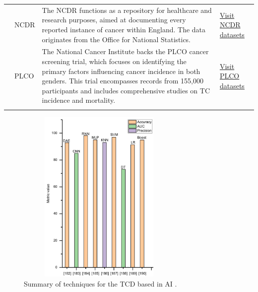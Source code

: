 \documentclass[a4paper,fleqn]{cas-sc}
\begin{document}
\begin{table}[tbph]
\begin{center}
\begin{tabular}{m{0.5cm}m{1cm}m{10cm}m{4cm}}
{ \cite{d6}} & { NCDR} &  The \ac{NCDR} functions as a repository for healthcare and research purposes, aimed at documenting every reported instance of cancer within England. The data originates from the Office for National Statistics. & \href{http://www.ncin.org.uk/about_ncin/}{Visit NCDR datasets} \\

{ \cite{d7}} & { PLCO} & The National Cancer Institute backs the \ac{PLCO} cancer screening trial, which focuses on identifying the primary factors influencing cancer incidence in both genders. This trial encompasses records from 155,000 participants and includes comprehensive studies on TC incidence and mortality. & \href{https://prevention.cancer.gov/major-programs/prostate-lung-colorectal-and-ovarian-cancer-screening-trial}{Visit PLCO datasets}\\


\\ \hline
\end{tabular}%
\end{center}
\end{table}





\begin{figure}[t!]
\centering
\includegraphics[height=8.5cm, width=8cm]{fig6.pdf}
\caption{Summary of techniques for the \ac{TCD} based in \ac{AI} \cite{li2020classification, ko2019deep, lee2019automatic, sharifi2021comparison, vairale2021recommendation, shen2020diagnosis, wu2020machine, borzouei2020diagnosing, li2020arb}.} 
\label{fig6}
\end{figure}
\end{document}
